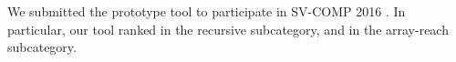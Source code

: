 We submitted the prototype tool to participate in SV-COMP 2016 \cite{svcomp16}. In particular, our tool ranked  in the recursive subcategory, and  in the array-reach subcategory. 


\begin{comment}
Numerous intraprocedural analysis techniques have been developed over the years.
Many tools are in fact freely available (see, for instance,
\textsc{Blast}~\cite{BeyerHJM07}, \textsc{CPAchecker}~\cite{BeyerK11}, and
\textsc{UFO}~\cite{AlbarghouthiLGC12}).
Interprocedural analysis techniques are also available (see~\cite{RepsHS95,
BallR01,CousotCFMMMR05,CuoqKKPSY12,coverity,polyspace} for a partial list).
Recently, recursive analysis attracts new attention.
The Competition on Software Verification adds a new category for recursive
programs in 2014~\cite{svcomp14}.
Among the participants, \textsc{CBMC}~\cite{ClarkeKL04},
\textsc{Ultimate Automizer}~\cite{HeizmannCDEHLNSP13}, and
\textsc{Ultimiate Kojak}~\cite{ErmisNDHP14} are the top three tools for the
\textbf{recursive} category.

Inspired by \textsc{Whale}~\cite{AlbarghouthiGC12}, we use inductive invariants
obtained from verifying under-approximation as candidates of summaries.
Also, similar to \textsc{Whale}, we apply a Hoare logic proof rule for recursive
calls from~\cite{Oheimb99}.
However, our technique works on control flow graphs and builds on an
intraprocedural analysis tool.
It is hence very lightweight and modular.
Better intraprocedural analysis tools easily give better recursive analysis
through our technique.
\textsc{Whale}, on the other hand, analyzes by exploring abstract reachability
graphs.
Since \textsc{Whale} extends summary computation and covering relations for
recursion, its implementation is more involved.

Aside from recursion analysis, using program transformation to reduce program
features is not a new concept.
We learned this concept particularly from~\cite{LalR08,LalR09},
where a program transformation technique for checking context-bounded concurrent
programs to sequential analysis is developed.
\end{comment}

